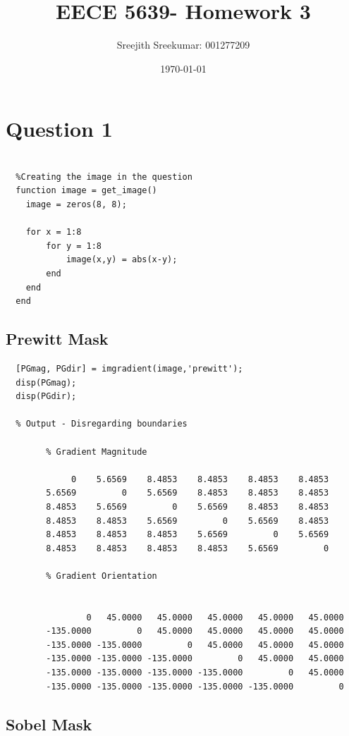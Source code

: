 \documentclass{article}
\title{EECE 5639- Homework 3}
\author{Sreejith Sreekumar: 001277209}
\date{\today}
\begin{document}
\maketitle

\section*{Question 1}

\begin{verbatim}

  %Creating the image in the question
  function image = get_image()
    image = zeros(8, 8);
    
    for x = 1:8
        for y = 1:8
            image(x,y) = abs(x-y);
        end
    end
  end
\end{verbatim}

\subsection*{Prewitt Mask}
\begin{verbatim}
  [PGmag, PGdir] = imgradient(image,'prewitt');
  disp(PGmag);
  disp(PGdir);

  % Output - Disregarding boundaries

        % Gradient Magnitude
  
             0    5.6569    8.4853    8.4853    8.4853    8.4853    
        5.6569         0    5.6569    8.4853    8.4853    8.4853    
        8.4853    5.6569         0    5.6569    8.4853    8.4853    
        8.4853    8.4853    5.6569         0    5.6569    8.4853    
        8.4853    8.4853    8.4853    5.6569         0    5.6569    
        8.4853    8.4853    8.4853    8.4853    5.6569         0   

        % Gradient Orientation


                0   45.0000   45.0000   45.0000   45.0000   45.0000   
        -135.0000         0   45.0000   45.0000   45.0000   45.0000   
        -135.0000 -135.0000         0   45.0000   45.0000   45.0000   
        -135.0000 -135.0000 -135.0000         0   45.0000   45.0000   
        -135.0000 -135.0000 -135.0000 -135.0000         0   45.0000   
        -135.0000 -135.0000 -135.0000 -135.0000 -135.0000         0   
\end{verbatim}

\pagebreak

\subsection*{Sobel Mask}
\end{document}
